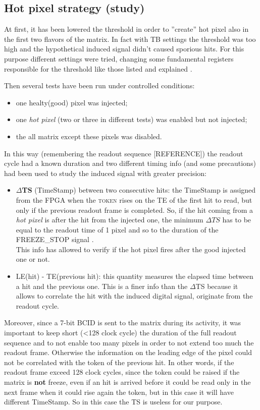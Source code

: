 \subsection{Hot pixel strategy (study)}

At first, it has been lowered the threshold in order to ''create'' hot pixel also in the first two flavors of the matrix. In fact with TB settings the threshold was too high and the hypothetical induced signal didn't caused sporious hits. For this purpose different settings were tried, changing some fundamental registers responsible for the threshold like those listed and explained . 

Then several tests have been run under controlled conditions:
\begin{itemize}
\item one healty(good) pixel was injected;
\item one \textit{hot pixel} (two or three in different tests) was enabled but not injected;
\item the all matrix except these pixels was disabled.
\end{itemize}

In this way (remembering the readout sequence [REFERENCE]) the readout cycle had a known duration and two different timing info (and some precautions) had been used to study the induced signal with greater precision:

\begin{itemize}
\item \textbf{$\Delta$TS} (TimeStamp) between two consecutive hits: the TimeStamp is assigned from the FPGA when the \textsc{token} rises on the TE of the first hit to read, but only if the previous readout frame is completed. So, if the hit coming from a \textit{hot pixel} is after the hit from the injected one, the minimum $\Delta TS$ has to be equal to the readout time of 1 pixel and so to the duration of the \textsc{FREEZE\_STOP} signal .\\
This info has allowed to verify if the hot pixel fires after the good injected one or not.
\item LE(hit) - TE(previous hit): this quantity measures the elapsed time between a hit and the previous one. This is a finer info than the $\Delta$TS because it allows to correlate the hit with the induced digital signal, originate from the readout cycle.
\end{itemize}

Moreover, since a 7-bit BCID is sent to the matrix during its activity, it was important to keep short (<128 clock cycle) the duration of the full readout sequence and to not enable too many pixels in order to not extend too much the readout frame. Otherwise the information on the leading edge of the pixel could not be correlated with the token of the previous hit. In other words, if the readout frame exceed 128 clock cycles, since the token could be raised if the matrix is \textbf{not} freeze, even if an hit is arrived before it could be read only in the next frame when it could rise again the token, but in this case it will have different TimeStamp. So in this case the TS is useless for our purpose.


